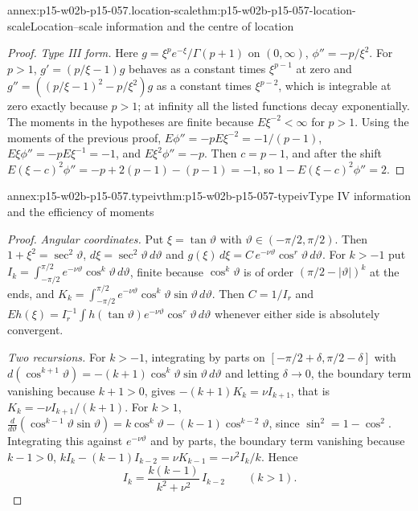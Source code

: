 \begin{annexitem}{annex:p15-w02b-p15-057.location-scale}{thm:p15-w02b-p15-057-location-scale}{Location--scale information and the centre of location}
\begin{proof}
\emph{Type III form.} Here \(g=\xi^pe^{-\xi}/\Gamma(p+1)\) on
\((0,\infty)\), \(\phi''=-p/\xi^2\). For \(p>1\),
\(g'=(p/\xi-1)g\) behaves as a constant times \(\xi^{p-1}\) at zero and
\(g''=((p/\xi-1)^2-p/\xi^2)g\) as a constant times \(\xi^{p-2}\), which is
integrable at zero exactly because \(p>1\); at infinity all the listed
functions decay exponentially. The moments in the hypotheses are finite
because \(E\xi^{-2}<\infty\) for \(p>1\). Using the moments of the
previous proof, \(E\phi''=-pE\xi^{-2}=-1/(p-1)\), \(E\xi\phi''=-pE\xi^{-1}
=-1\), and \(E\xi^2\phi''=-p\). Then \(c=p-1\), and after the shift
\(E(\xi-c)^2\phi''=-p+2(p-1)-(p-1)=-1\), so \(1-E(\xi-c)^2\phi''=2\).
\end{proof}
\end{annexitem}

\begin{annexitem}{annex:p15-w02b-p15-057.typeiv}{thm:p15-w02b-p15-057-typeiv}{Type IV information and the efficiency of moments}
\begin{proof}
\emph{Angular coordinates.} Put \(\xi=\tan\vartheta\) with
\(\vartheta\in(-\pi/2,\pi/2)\). Then \(1+\xi^2=\sec^2\vartheta\),
\(d\xi=\sec^2\vartheta\,d\vartheta\) and
\(g(\xi)\,d\xi=C\,e^{-\nu\vartheta}\cos^r\vartheta\,d\vartheta\). For
\(k>-1\) put
\(I_k=\int_{-\pi/2}^{\pi/2}e^{-\nu\vartheta}\cos^k\vartheta\,d\vartheta\),
finite because \(\cos^k\vartheta\) is of order
\((\pi/2-|\vartheta|)^k\) at the ends, and
\(K_k=\int_{-\pi/2}^{\pi/2}e^{-\nu\vartheta}\cos^k\vartheta\sin\vartheta
\,d\vartheta\). Then \(C=1/I_r\) and \(Eh(\xi)=I_r^{-1}\int
h(\tan\vartheta)e^{-\nu\vartheta}\cos^r\vartheta\,d\vartheta\) whenever
either side is absolutely convergent.

\emph{Two recursions.} For \(k>-1\), integrating by parts on
\([-\pi/2+\delta,\pi/2-\delta]\) with
\(d(\cos^{k+1}\vartheta)=-(k+1)\cos^k\vartheta\sin\vartheta\,d\vartheta\)
and letting \(\delta\to0\), the boundary term vanishing because
\(k+1>0\), gives \(-(k+1)K_k=\nu I_{k+1}\), that is
\(K_k=-\nu I_{k+1}/(k+1)\). For \(k>1\),
\(\frac{d}{d\vartheta}(\cos^{k-1}\vartheta\sin\vartheta)
=k\cos^k\vartheta-(k-1)\cos^{k-2}\vartheta\), since
\(\sin^2=1-\cos^2\). Integrating this against \(e^{-\nu\vartheta}\) and
by parts, the boundary term vanishing because \(k-1>0\),
\(kI_k-(k-1)I_{k-2}=\nu K_{k-1}=-\nu^2I_k/k\). Hence
\[
 I_k=\frac{k(k-1)}{k^2+\nu^2}\,I_{k-2}\qquad(k>1).
\]


\end{proof}
\end{annexitem}
